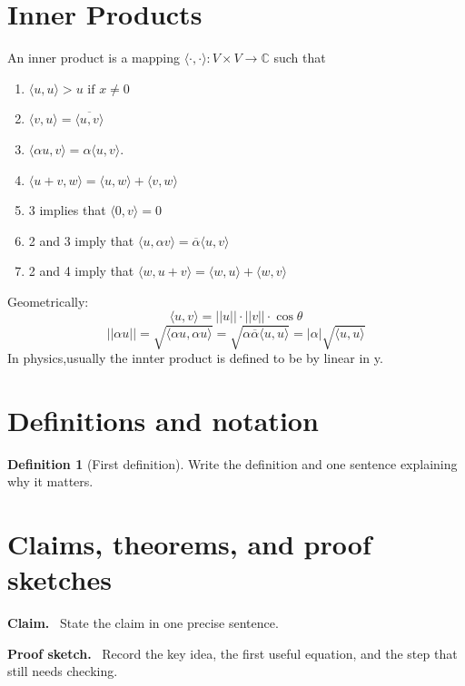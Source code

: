 \documentclass[11pt]{article}
\newcommand{\1}{\mathbf{1}}
\theoremstyle{notestyle}
\theoremstyle{definition}
\newtheorem{definition}[theorem]{Definition}
\newenvironment{claim}{\par\noindent\textbf{Claim.}\ }{\par}
\newenvironment{proofsketch}{\par\noindent\textbf{Proof sketch.}\ }{\par}
\begin{document}
\section{Inner Products}
An inner product is a mapping
\(
\langle \cdot,\cdot\rangle : V\times V \to \mathbb{C}
\)
such that
\begin{enumerate}
    \item $\langle u, u\rangle > u \text{ if } x \ne 0$
    \item $\langle v, u\rangle = \overline{\langle u, v \rangle}$
    \item $\langle \alpha u, v\rangle = \alpha \langle u, v \rangle.$
    \item $\langle u + v, w\rangle = \langle u, w\rangle + \langle v, w\rangle$
    \item 3 implies that $\langle 0, v\rangle = 0$
    \item 2 and 3 imply that $\langle u, \alpha v\rangle = \overline{\alpha}\langle u,
        v\rangle$ 
    \item 2 and 4 imply that $\langle w, u + v \rangle = \langle w, u \rangle + \langle
        w, v\rangle$
\end{enumerate}
Geometrically: $$\langle u, v \rangle = ||u|| \cdot ||v|| \cdot \cos \theta$$
$$|| \alpha u || = \sqrt{\langle \alpha u, \alpha u \rangle } = \sqrt{\alpha
\overline{\alpha} \langle u, u\rangle} = |\alpha|\sqrt{\langle u, u \rangle}$$
In physics,usually the innter product is defined to be by linear in y. 
\section{Definitions and notation}
\begin{definition}[First definition]
Write the definition and one sentence explaining why it matters.
\end{definition}

\section{Claims, theorems, and proof sketches}
\begin{claim}
State the claim in one precise sentence.
\end{claim}

\begin{proofsketch}
Record the key idea, the first useful equation, and the step that still needs checking.
\end{proofsketch}
\end{document}
